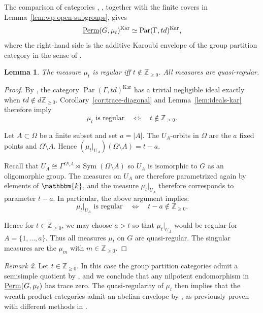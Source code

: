 \documentclass[11pt,a4paper]{amsart}
\theoremstyle{plain}%
\newtheorem{lemma}{Lemma}[subsection]
\theoremstyle{definition}
\theoremstyle{remark}
\newtheorem{remark}[lemma]{Remark}
\newcommand{\Z}{{\mathbb Z}}
\newcommand{\Perm}{\underline{{\rm Perm}}}
\newcommand{\kk}{\mathbbm{k}}
\newcommand{\Kar}{\mathrm{Kar}}
\begin{document}
The comparison of categories
\cite[Theorem~7.5]{Snowden-Knop},
\cite[Theorem~9.5]{Nyobe-Savage}, together with the finite covers
in Lemma~\ref{lem:wp-open-subgroups}, gives
\[
  \Perm(G,\mu_t)^{\Kar}
  \simeq \operatorname{Par}(\Gamma,td)^{\Kar},
\]
where the right-hand side is the additive Karoubi envelope of
the group partition category in the sense of \cite{Nyobe-Savage}. 



\begin{lemma}\label{lem:wreath-regular} The measure $\mu_t$ is regular iff $t \notin \mathbb{Z}_{\geq 0}$. All measures are quasi-regular.
\end{lemma}

\begin{proof}

By \cite[Corollary~9.6(b)]{Nyobe-Savage}, the category $\operatorname{Par}(\Gamma,td)^{\Kar}$ has a trivial negligible ideal exactly when
$td\notin d\mathbb Z_{\geq0}$.
Corollary~\ref{cor:trace-diagonal} and
Lemma~\ref{lem:ideals-kar} therefore imply
\[
  \mu_t\text{ is regular}
  \quad\Longleftrightarrow\quad t\notin\mathbb Z_{\geq0}.
\]

Let $A\subset \Omega$ be a finite subset and set $a=|A|$. The $U_A$-orbits in $\Omega$ are the $a$
fixed points and $\Omega\setminus A$. Hence
$(\mu_t|_{U_A})(\Omega\setminus A)=t-a$. 

Recall that $  U_A\cong\Gamma^{\Omega\setminus A}\rtimes
       \operatorname{Sym}(\Omega\setminus A)$ so $U_A$ is isomorphic to $G$ as an oligomorphic group. The measures on $U_A$ are therefore parametrized again by elements of $\kk$, and the measure
$\mu_t|_{U_A}$ therefore corresponds to parameter $t-a$. In particular, the above argument implies:
\begin{equation}\label{eq:wp-restricted-regularity}
      \mu_t|_{U_A}\text{ is regular}
  \quad\Longleftrightarrow\quad t-a\notin\mathbb Z_{\geq0}.
\end{equation}

Hence for $t\in \Z_{\geq 0}$, we may choose $a>t$ so that $\mu_t|_{U_A}$ would be regular for $A=\{1, \ldots, a\}$. Thus all measures $\mu_t$ on $G$ are quasi-regular. The singular measures are the $\mu_m$ with
$m\in\mathbb Z_{\geq0}$. 

\end{proof}

\begin{remark}
    Let $t \in \Z_{\geq 0}$. In this case the group partition categories admit a semisimple quotient by \cite{Nyobe-Savage}, and we conclude that any nilpotent endomorphism in $\Perm(G, \mu_t)$ has trace zero. The quasi-regularity of $\mu_t$ then implies that the wreath product categories admit an abelian envelope by \cite[§3.4]{HS-classical}, as previously proven with different methods in \cite{FHH}.
\end{remark}
\end{document}
